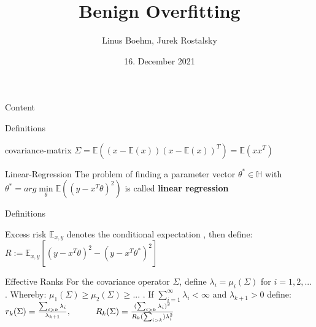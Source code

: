 \documentclass{beamer}
\title{Benign Overfitting}
\date{16. December 2021}
\author{Linus Boehm, Jurek Rostalsky}
\begin{document}
\maketitle

\begin{frame}{Content}
\tableofcontents
\end{frame}

\begin{frame}{Definitions}
\begin{center}
\begin{block}{covariance-matrix}
	$\Sigma = \mathbb{E}\left(\left(x - \mathbb{E}(x)\right)\left(x - \mathbb{E}(x)\right)^T\right) =  \mathbb{E}(xx^T)$
\end{block}
\begin{block}{Linear-Regression}
The problem of finding a parameter vector \(\theta^\ast \in \mathbb{H}\) with 
$\theta^\ast = arg \min\limits_\theta \mathbb{E}\left((y - x^T \theta)^2\right)$
is called \textbf{linear regression}
\end{block}
\end{center}
\end{frame}

\begin{frame}{Definitions}
\begin{center}
\begin{block}{Excess risk}
	$\mathbb{E}_{x,y}$ denotes the conditional expectation , then define:
	$R:= \mathbb{E}_{x,y}[(y - x^T\theta)^2 - (y - x^T\theta^*)^2]$
\end{block}
\begin{block}{Effective Ranks}
	For the covariance operator $\Sigma$, define $\lambda_i = \mu_i(\Sigma)$ for $i = 1,2,...$ . Whereby: $\mu_1(\Sigma) \geq \mu_2(\Sigma) \geq ...$ . If $\sum\limits_{i=1}^\infty \lambda_i < \infty$ and $\lambda_{k+1} > 0$
	define: 
	$r_k(\Sigma) = \frac{\sum_{i>k}\lambda_i}{\lambda_{k+1}} ,\hspace*{1cm}
	R_k(\Sigma) = \frac{(\sum_{i>k}\lambda_i)^2}{R_k(\sum_{i>k})\lambda_i^2}$
\end{block}
\end{center}
\end{frame}
\end{document}
